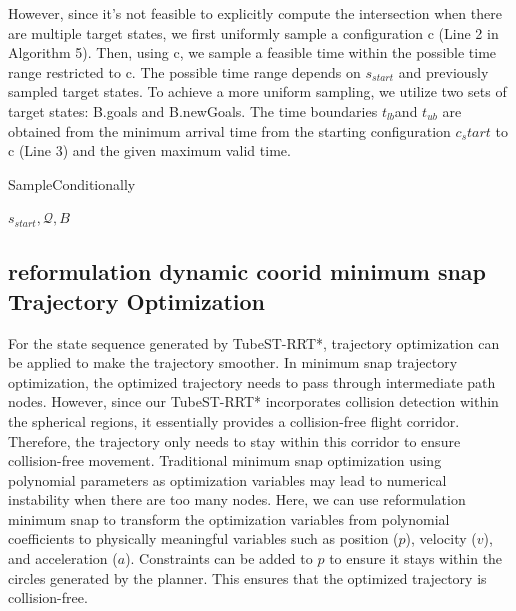 \documentclass[times,authoryear]{elsarticle}
\newcommand{\Input}{\item[\textbf{Input:}]}
\begin{document}
However, since it's not feasible to explicitly compute the intersection when there are multiple target states, we first uniformly sample a configuration c (Line 2 in Algorithm 5). Then, using c, we sample a feasible time within the possible time range restricted to c. The possible time range depends on $s_{start}$ and previously sampled target states. To achieve a more uniform sampling, we utilize two sets of target states: B.goals and B.newGoals. The time boundaries $t_{lb}$and $t_{ub}$ are obtained from the minimum arrival time from the starting configuration $c_start$ to c (Line 3) and the given maximum valid time.

\begin{algorithm}[H]
	\caption[short]{SampleConditionally}
	\begin{algorithmic}[1]
		\Input{$s_{start},\mathcal{Q},B$}
		\WHILE{}
		\ELSE{}
		\ENDIF{}
		\ENDWHILE{}
	\end{algorithmic}
\end{algorithm}

\subsection{reformulation dynamic coorid minimum snap Trajectory Optimization}
For the state sequence generated by TubeST-RRT*, trajectory optimization can be applied to make the trajectory smoother. In minimum snap trajectory optimization, the optimized trajectory needs to pass through intermediate path nodes. However, since our TubeST-RRT* incorporates collision detection within the spherical regions, it essentially provides a collision-free flight corridor. Therefore, the trajectory only needs to stay within this corridor to ensure collision-free movement. Traditional minimum snap optimization using polynomial parameters as optimization variables may lead to numerical instability when there are too many nodes. Here, we can use reformulation minimum snap to transform the optimization variables from polynomial coefficients to physically meaningful variables such as position ($p$), velocity ($v$), and acceleration ($a$). Constraints can be added to $p$ to ensure it stays within the circles generated by the planner. This ensures that the optimized trajectory is collision-free.
\end{document}
